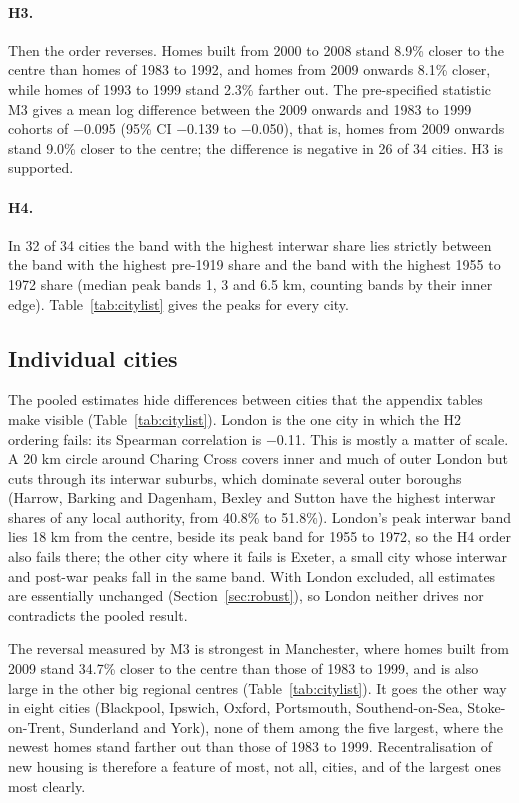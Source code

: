\documentclass[11pt,a4paper]{article}
\begin{document}
\paragraph{H3.} Then the order reverses. Homes built from 2000 to 2008 stand 8.9\% closer to the centre than homes of 1983 to 1992, and homes from 2009 onwards 8.1\% closer, while homes of 1993 to 1999 stand 2.3\% farther out. The pre-specified statistic M3 gives a mean log difference between the 2009 onwards and 1983 to 1999 cohorts of $-$0.095 (95\% CI $-$0.139 to $-$0.050), that is, homes from 2009 onwards stand 9.0\% closer to the centre; the difference is negative in 26 of 34 cities. H3 is supported.

\paragraph{H4.} In 32 of 34 cities the band with the highest interwar share lies strictly between the band with the highest pre-1919 share and the band with the highest 1955 to 1972 share (median peak bands 1, 3 and 6.5 km, counting bands by their inner edge). Table~\ref{tab:citylist} gives the peaks for every city.

\subsection{Individual cities}
The pooled estimates hide differences between cities that the appendix tables make visible (Table~\ref{tab:citylist}). London is the one city in which the H2 ordering fails: its Spearman correlation is $-$0.11. This is mostly a matter of scale. A 20 km circle around Charing Cross covers inner and much of outer London but cuts through its interwar suburbs, which dominate several outer boroughs (Harrow, Barking and Dagenham, Bexley and Sutton have the highest interwar shares of any local authority, from 40.8\% to 51.8\%). London's peak interwar band lies 18 km from the centre, beside its peak band for 1955 to 1972, so the H4 order also fails there; the other city where it fails is Exeter, a small city whose interwar and post-war peaks fall in the same band. With London excluded, all estimates are essentially unchanged (Section~\ref{sec:robust}), so London neither drives nor contradicts the pooled result.

The reversal measured by M3 is strongest in Manchester, where homes built from 2009 stand 34.7\% closer to the centre than those of 1983 to 1999, and is also large in the other big regional centres (Table~\ref{tab:citylist}). It goes the other way in eight cities (Blackpool, Ipswich, Oxford, Portsmouth, Southend-on-Sea, Stoke-on-Trent, Sunderland and York), none of them among the five largest, where the newest homes stand farther out than those of 1983 to 1999. Recentralisation of new housing is therefore a feature of most, not all, cities, and of the largest ones most clearly.
\end{document}
